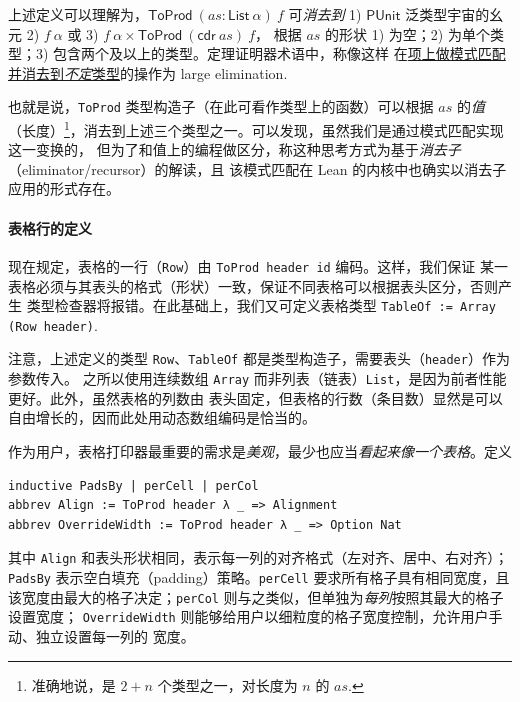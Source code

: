 上述定义可以理解为，$\mathsf{ToProd}\ (as : \mathsf{List}\ \alpha)\ f$ 可\emph{消去到} 1) $\mathsf{PUnit}$
泛类型宇宙的幺元 2) $f\ \alpha$ 或 3) $f\ \alpha \times \mathsf{ToProd}\ (\mathsf{cdr}\ as)\ f$，
根据 $as$ 的形状 1) 为空；2) 为单个类型；3) 包含两个及以上的类型。定理证明器术语中，称像这样
在\underline{项上做模式匹配并消去到\emph{不定}类型}的操作为 large elimination.

也就是说，\texttt{ToProd} 类型构造子（在此可看作类型上的函数）可以根据
$as$ 的\emph{值}（长度）\footnote{
准确地说，是 $2 + n$ 个类型之一，对长度为 $n$ 的 $as$.
}，消去到上述三个类型之一。可以发现，虽然我们是通过模式匹配实现这一变换的，
但为了和值上的编程做区分，称这种思考方式为基于\emph{消去子}（eliminator/recursor）的解读，且
该模式匹配在 Lean 的内核中也确实以消去子应用的形式存在。


\paragraph{表格行的定义} 现在规定，表格的一行（\texttt{Row}）由 \texttt{ToProd header id} 编码。这样，我们保证
某一表格必须与其表头的格式（形状）一致，保证不同表格可以根据表头区分，否则产生
类型检查器将报错。在此基础上，我们又可定义表格类型 \texttt{TableOf := Array (Row header)}.

注意，上述定义的类型 \texttt{Row}、\texttt{TableOf} 都是类型构造子，需要表头（\texttt{header}）作为参数传入。
之所以使用连续数组 \texttt{Array} 而非列表（链表）\texttt{List}，是因为前者性能更好。此外，虽然表格的列数由
表头固定，但表格的行数（条目数）显然是可以自由增长的，因而此处用动态数组编码是恰当的。

作为用户，表格打印器最重要的需求是\emph{美观}，最少也应当\emph{看起来像一个表格}。定义
\begin{verbatim}
inductive PadsBy | perCell | perCol
abbrev Align := ToProd header λ _ => Alignment
abbrev OverrideWidth := ToProd header λ _ => Option Nat
\end{verbatim}
其中 \texttt{Align} 和表头形状相同，表示每一列的对齐格式（左对齐、居中、右对齐）；
\texttt{PadsBy} 表示空白填充（padding）策略。\texttt{perCell} 要求所有格子具有相同宽度，且
该宽度由最大的格子决定；\texttt{perCol} 则与之类似，但单独为\emph{每列}按照其最大的格子设置宽度；
\texttt{OverrideWidth} 则能够给用户以细粒度的格子宽度控制，允许用户手动、独立设置每一列的
宽度。

